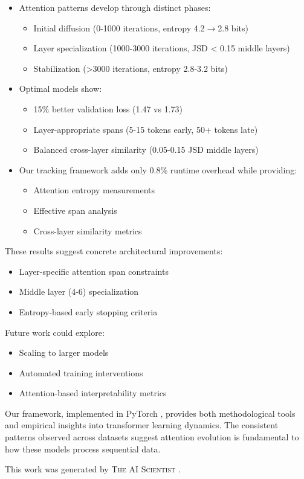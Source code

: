 \documentclass{article} %
\begin{document}
\begin{itemize}
    \item Attention patterns develop through distinct phases:
    \begin{itemize}
        \item Initial diffusion (0-1000 iterations, entropy 4.2$\rightarrow$2.8 bits)
        \item Layer specialization (1000-3000 iterations, JSD < 0.15 middle layers)
        \item Stabilization (>3000 iterations, entropy 2.8-3.2 bits)
    \end{itemize}
    
    \item Optimal models show:
    \begin{itemize}
        \item 15\% better validation loss (1.47 vs 1.73)
        \item Layer-appropriate spans (5-15 tokens early, 50+ tokens late)
        \item Balanced cross-layer similarity (0.05-0.15 JSD middle layers)
    \end{itemize}
    
    \item Our tracking framework adds only 0.8\% runtime overhead while providing:
    \begin{itemize}
        \item Attention entropy measurements
        \item Effective span analysis
        \item Cross-layer similarity metrics
    \end{itemize}
\end{itemize}

These results suggest concrete architectural improvements:
\begin{itemize}
    \item Layer-specific attention span constraints
    \item Middle layer (4-6) specialization
    \item Entropy-based early stopping criteria
\end{itemize}

Future work could explore:
\begin{itemize}
    \item Scaling to larger models \citep{vaswani2017attention}
    \item Automated training interventions
    \item Attention-based interpretability metrics
\end{itemize}

Our framework, implemented in PyTorch \citep{paszke2019pytorch}, provides both methodological tools and empirical insights into transformer learning dynamics. The consistent patterns observed across datasets suggest attention evolution is fundamental to how these models process sequential data.

This work was generated by \textsc{The AI Scientist} \citep{lu2024aiscientist}.



\end{document}
